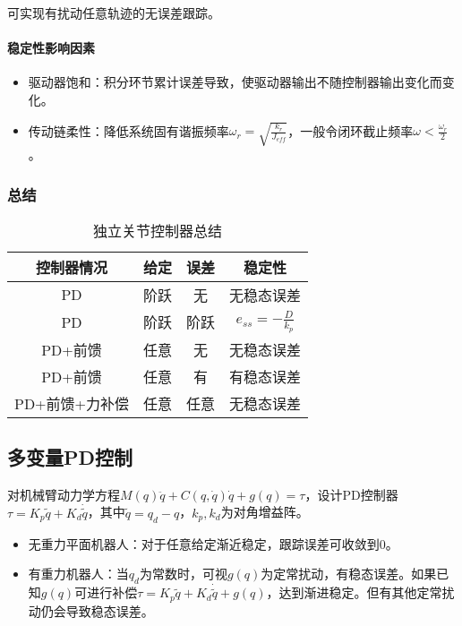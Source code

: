 \documentclass[
12pt, %
a4paper, 
oneside, %
headinclude,footinclude, %
]{scrartcl}
\begin{document}
可实现有扰动任意轨迹的无误差跟踪。
\paragraph{稳定性影响因素}
\begin{itemize}
\item 驱动器饱和：积分环节累计误差导致，使驱动器输出不随控制器输出变化而变化。
\item 传动链柔性：降低系统固有谐振频率$ \omega_r = \sqrt{\frac{k_r}{J_{eff}}} $，一般令闭环截止频率$ \omega < \frac{\omega_r}{2} $。
\end{itemize}
\subsubsection[总结]{总结}
\begin{table}[H]
\centering
\begin{tabular}{c|c|c|c}
\hline
控制器情况 & 给定 & 误差 & 稳定性 \\
\hline
PD & 阶跃 & 无 & 无稳态误差 \\
PD & 阶跃 & 阶跃 & $ e_{ss} = -\frac{D}{k_p} $ \\
PD+前馈 & 任意 & 无 & 无稳态误差 \\
PD+前馈 & 任意 & 有 & 有稳态误差 \\
PD+前馈+力补偿 & 任意 & 任意 & 无稳态误差 \\
\hline
\end{tabular}
\caption{独立关节控制器总结}
\end{table}
\subsection[多变量PD控制]{多变量PD控制}
对机械臂动力学方程$ M(q) \ddot{q} + C(q, \dot{q})\dot{q} + g(q) = \tau $，设计PD控制器$ \tau = K_p \tilde{q} + K_d \dot{\tilde{q}} $，其中$ \tilde{q} = q_d - q $，$ k_p, k_d $为对角增益阵。
\begin{itemize}
\item 无重力平面机器人：对于任意给定渐近稳定，跟踪误差可收敛到$ 0 $。
\item 有重力机器人：当$ q_d $为常数时，可视$ g(q) $为定常扰动，有稳态误差。如果已知$ g(q) $可进行补偿$ \tau = K_p \tilde{q} + K_d \dot{\tilde{q}} + g(q) $，达到渐进稳定。但有其他定常扰动仍会导致稳态误差。
\end{itemize}
\end{document}
